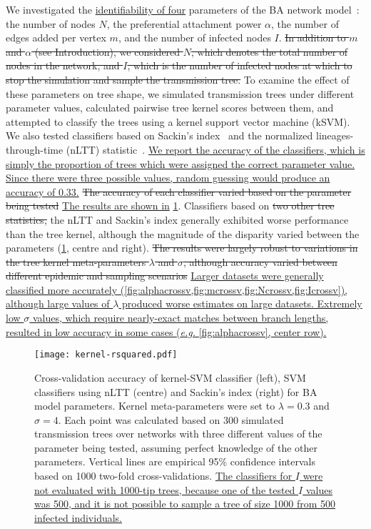 \documentclass[12pt]{article}\usepackage[]{graphicx}\usepackage[]{color}
\let\mref\cref
\renewcommand{\cref}[1]{\mbox{\mref{#1}}}
\newcommand{\add}[1]{\color{blue} \uline{#1} \color{black}}
\newcommand{\del}[1]{\color{red} \sout{#1} \color{black}}
\begin{document}
We investigated the \add{identifiability of four} parameters of the BA network
model~\autocite{barabasi1999emergence}: the number of nodes $N$, the
preferential attachment power $\alpha$, the number of edges added per vertex
$m$, and the number of infected nodes $I$. \del{In addition to $m$ and $\alpha$
(see Introduction), we considered $N$, which denotes the total number of nodes
in the network, and $I$, which is the number of infected nodes at which to stop
the simulation and sample the transmission tree.} To examine the effect of
these parameters on tree shape, we simulated transmission trees under different
parameter values, calculated pairwise tree kernel scores between them, and
attempted to classify the trees using a kernel support vector machine (kSVM).
We also tested classifiers based on Sackin's index~\autocite{shao1990tree} and
the normalized lineages-through-time (nLTT)
statistic~\autocite{janzen2015approximate}. \add{We report the accuracy of the
classifiers, which is simply the proportion of trees which were assigned the
correct parameter value. Since there were three possible values, random
guessing would produce an accuracy of 0.33.} \del{The accuracy of each
classifier varied based on the parameter being tested} \add{The results are
shown in} \cref{fig:rsquared}. Classifiers based on \del{two other tree
statistics,} the nLTT and Sackin's index generally exhibited worse performance
than the tree kernel, although the magnitude of the disparity varied between
the parameters (\cref{fig:rsquared}, centre and right). \del{The results were
largely robust to variations in the tree kernel meta-parameters $\lambda$ and
$\sigma$, although accuracy varied between different epidemic and sampling
scenarios} \add{Larger datasets were generally classified more accurately
(\cref{fig:alphacrossv,fig:mcrossv,fig:Ncrossv,fig:Icrossv}), although large
values of $\lambda$ produced worse estimates on large datasets. Extremely low
$\sigma$ values, which require nearly-exact matches between branch lengths,
resulted in low accuracy in some cases (\textit{e.g.} \cref{fig:alphacrossv},
center row).}

\begin{figure}[ht]
    \centering
    \texttt{[image: kernel-rsquared.pdf]}
    \caption[
        Cross-validation accuracy of kernel-SVM, nLTT-based SVM, and Sackin's
        index SVM classifiers for BA model parameters.
    ]{
        Cross-validation accuracy of kernel-SVM classifier (left), SVM
        classifiers using nLTT (centre) and Sackin's index (right) for BA model
        parameters. Kernel meta-parameters were set to $\lambda = 0.3$ and
        $\sigma = 4$. Each point was calculated based on 300 simulated
        transmission trees over networks with three different values of the
        parameter being tested, assuming perfect knowledge of the other
        parameters. Vertical lines are empirical 95\% confidence intervals
        based on 1000 two-fold cross-validations. \add{The classifiers for $I$
        were not evaluated with 1000-tip trees, because one of the tested $I$
        values was 500, and it is not possible to sample a tree of size 1000
        from 500 infected individuals.}
    }
    \label{fig:rsquared}
\end{figure}
\end{document}
